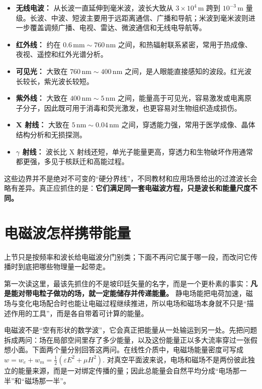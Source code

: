 \documentclass[lang=cn,11pt]{elegantbook}
\begin{document}
\begin{itemize}
 \item \textbf{无线电波：} 从长波一直延伸到毫米波，波长大致从 \(3\times 10^4\,\mathrm{m}\) 跨到 \(10^{-3}\,\mathrm{m}\) 量级。长波、中波、短波主要用于远距离通信、广播和导航；米波到毫米波则进一步覆盖调频广播、电视、雷达、微波通信和无线电导航等。
 \item \textbf{红外线：} 约在 \(0.6\,\mathrm{mm}\sim 760\,\mathrm{nm}\) 之间，和热辐射联系紧密，常用于热成像、夜视、遥控和红外光谱分析。
 \item \textbf{可见光：} 大致在 \(760\,\mathrm{nm}\sim 400\,\mathrm{nm}\) 之间，是人眼能直接感知的波段。红光波长较长，紫光波长较短。
 \item \textbf{紫外线：} 大致在 \(400\,\mathrm{nm}\sim 5\,\mathrm{nm}\) 之间，能量高于可见光，容易激发或电离原子分子，因此既可用于消毒和荧光激发，也更容易对生物组织造成损伤。
 \item \textbf{X 射线：} 大致在 \(5\,\mathrm{nm}\sim 0.04\,\mathrm{nm}\) 之间，穿透能力强，常用于医学成像、晶体结构分析和无损探测。
 \item \textbf{\(\gamma\) 射线：} 波长比 X 射线还短，单光子能量更高，穿透力和生物破坏作用通常都更强，多见于核跃迁和高能过程。
\end{itemize}

\begin{remark}
这些边界并不是绝对不可变的“硬分界线”，不同教材和应用场景给出的过渡波长会略有差异。真正应抓住的是：\textbf{它们满足同一套电磁波方程，只是波长和能量尺度不同。}
\end{remark}

\section{电磁波怎样携带能量}

上节只是按频率和波长给电磁波分门别类；下面不再问它属于哪一段，而改问它传播时到底把哪些物理量一起带走。

第一次读这里，最该先抓住的不是坡印廷矢量的名字，而是一个更朴素的事实：\textbf{凡是能对带电粒子做功的场，就一定能储存并传递能量。} 静电场能把电荷加速，磁场与变化电场配合时也能让电磁过程继续推进，所以电场和磁场本身就不只是“描述作用的工具”，而是各自带着可计算的能量。

电磁波不是“空有形状的数学波”，它会真正把能量从一处输运到另一处。先把问题拆成两问：场在局部空间里存了多少能量，以及这份能量正以多大流率穿过一张假想小面。下面两个量分别回答这两问。在线性介质中，电磁场能量密度可写成
 \(w=w_e+w_m =\frac12\left(\varepsilon E^2+\mu H^2\right).\) 
对真空平面波来说，电场和磁场不是两份彼此独立的能量来源，而是一对绑定传播的量；因此总能量会自然平均分成“电场那一半”和“磁场那一半”。
\end{document}
